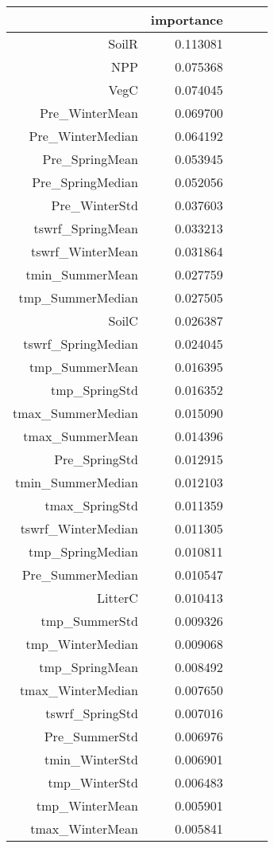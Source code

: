 \begin{table}[h]
\centering
\label{table:5}
\begin{tabular}{rrrrr}
\toprule
 & importance \\
\midrule
SoilR & 0.113081 \\
NPP & 0.075368 \\
VegC & 0.074045 \\
Pre_WinterMean & 0.069700 \\
Pre_WinterMedian & 0.064192 \\
Pre_SpringMean & 0.053945 \\
Pre_SpringMedian & 0.052056 \\
Pre_WinterStd & 0.037603 \\
tswrf_SpringMean & 0.033213 \\
tswrf_WinterMean & 0.031864 \\
tmin_SummerMean & 0.027759 \\
tmp_SummerMedian & 0.027505 \\
SoilC & 0.026387 \\
tswrf_SpringMedian & 0.024045 \\
tmp_SummerMean & 0.016395 \\
tmp_SpringStd & 0.016352 \\
tmax_SummerMedian & 0.015090 \\
tmax_SummerMean & 0.014396 \\
Pre_SpringStd & 0.012915 \\
tmin_SummerMedian & 0.012103 \\
tmax_SpringStd & 0.011359 \\
tswrf_WinterMedian & 0.011305 \\
tmp_SpringMedian & 0.010811 \\
Pre_SummerMedian & 0.010547 \\
LitterC & 0.010413 \\
tmp_SummerStd & 0.009326 \\
tmp_WinterMedian & 0.009068 \\
tmp_SpringMean & 0.008492 \\
tmax_WinterMedian & 0.007650 \\
tswrf_SpringStd & 0.007016 \\
Pre_SummerStd & 0.006976 \\
tmin_WinterStd & 0.006901 \\
tmp_WinterStd & 0.006483 \\
tmp_WinterMean & 0.005901 \\
tmax_WinterMean & 0.005841 \\

\end{tabular}
\end{table}

